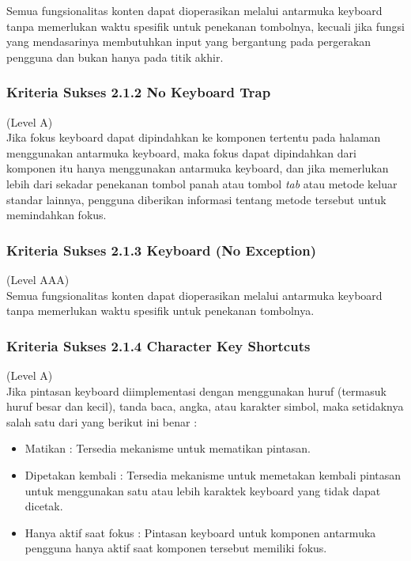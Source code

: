 \documentclass[a4paper,twoside]{article}
\begin{document}
\begin{enumerate}
		Semua fungsionalitas konten dapat dioperasikan melalui antarmuka keyboard tanpa memerlukan waktu spesifik untuk penekanan tombolnya, kecuali jika fungsi yang mendasarinya membutuhkan input yang bergantung pada pergerakan pengguna dan bukan hanya pada titik akhir.
		
		\subsubsection*{Kriteria Sukses 2.1.2 No Keyboard Trap}
		\label{subsubsec:kriteria_2.1.2}
		(Level A) \\
		
		Jika fokus keyboard dapat dipindahkan ke komponen tertentu pada halaman menggunakan antarmuka keyboard, maka fokus dapat dipindahkan dari komponen itu hanya menggunakan antarmuka keyboard, dan jika memerlukan lebih dari sekadar penekanan tombol panah atau tombol \textit{tab} atau metode keluar standar lainnya, pengguna diberikan informasi tentang metode tersebut untuk memindahkan fokus.
		
		\subsubsection*{Kriteria Sukses 2.1.3 Keyboard (No Exception)}
		\label{subsubsec:kriteria_2.1.3}
		(Level AAA) \\
		
		Semua fungsionalitas konten dapat dioperasikan melalui antarmuka keyboard tanpa memerlukan waktu spesifik untuk penekanan tombolnya.
		
		\subsubsection*{Kriteria Sukses 2.1.4 Character Key Shortcuts}
		\label{subsubsec:kriteria_2.1.4}
		(Level A) \\
		
		Jika pintasan keyboard diimplementasi dengan menggunakan huruf (termasuk huruf besar dan kecil), tanda baca, angka, atau karakter simbol, maka setidaknya salah satu dari yang berikut ini benar :
		
		\begin{itemize}
			\item Matikan : Tersedia mekanisme untuk mematikan pintasan.
			\item Dipetakan kembali : Tersedia mekanisme untuk memetakan kembali pintasan untuk menggunakan satu atau lebih karaktek keyboard yang tidak dapat dicetak.
			\item Hanya aktif saat fokus : Pintasan keyboard untuk komponen antarmuka pengguna hanya aktif saat komponen tersebut memiliki fokus.
		\end{itemize}
		

\end{enumerate}
\end{document}
